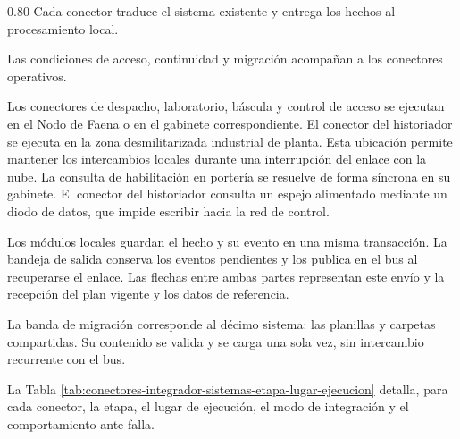 \documentclass[subdoc]{../../comun/overfore}
\begin{document}
\begin{horizontal}
\expandafter\def\csname ov@altofig\endcsname{0.80}
\begingroup
\def\thefigure{4.15a}
\def\theHfigure{4.15a}
\endgroup
Cada conector traduce el sistema existente y entrega los hechos al procesamiento local.

\clearpage
\addtocounter{figure}{-1}
\begingroup
\def\thefigure{4.15b}
\def\theHfigure{4.15b}
\endgroup
Las condiciones de acceso, continuidad y migración acompañan a los conectores operativos.

\end{horizontal}
Los conectores de despacho, laboratorio, báscula y control de acceso se ejecutan en el Nodo de Faena o en el gabinete correspondiente. El conector del historiador se ejecuta en la zona desmilitarizada industrial de planta. Esta ubicación permite mantener los intercambios locales durante una interrupción del enlace con la nube. La consulta de habilitación en portería se resuelve de forma síncrona en su gabinete. El conector del historiador consulta un espejo alimentado mediante un diodo de datos, que impide escribir hacia la red de control.

Los módulos locales guardan el hecho y su evento en una misma transacción. La bandeja de salida conserva los eventos pendientes y los publica en el bus al recuperarse el enlace. Las flechas entre ambas partes representan este envío y la recepción del plan vigente y los datos de referencia.

La banda de migración corresponde al décimo sistema: las planillas y carpetas compartidas. Su contenido se valida y se carga una sola vez, sin intercambio recurrente con el bus.

La Tabla \ref{tab:conectores-integrador-sistemas-etapa-lugar-ejecucion} detalla, para cada conector, la etapa, el lugar de ejecución, el modo de integración y el comportamiento ante falla.
\end{document}
